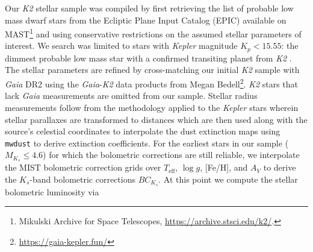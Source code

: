 \documentclass[modern]{aastex63}
\newcommand\gaia{\emph{Gaia}}
\newcommand\kepler{\emph{Kepler}}
\newcommand\ktwo{\emph{K2}}
\newcommand\teff{$T_{\text{eff}}$}
\newcommand\logg{$\log{g}$}
\begin{document}
Our \ktwo{} stellar sample was compiled by first retrieving the list of probable low mass dwarf stars
from the Ecliptic Plane Input Catalog (EPIC) available on MAST\footnote{Mikulski Archive for Space Telescopes,
  \url{https://archive.stsci.edu/k2/}.} and using conservative restrictions on the assumed stellar parameters
of interest. 
We search was limited to stars with \kepler{}
magnitude $K_p<\mathbf{15.55}$: the dimmest probable low mass star with a confirmed transiting planet from \ktwo{}
\citep[NASA Exoplanet Archive;][]{akeson13}. %
The stellar parameters are refined by cross-matching our initial \ktwo{} sample with \gaia{}  
DR2 using the \gaia{-}\ktwo{} data products from Megan Bedell\footnote{\url{https://gaia-kepler.fun/}}. %
\ktwo{} stars that lack \gaia{} measurements are omitted from our sample.
Stellar radius measurements follow from the methodology applied to the \kepler{} stars 
wherein stellar parallaxes are transformed to distances\citep{bailerjones18} which are then used along with
the source's celestial coordinates to interpolate the dust extinction maps using \texttt{mwdust} \citep{bovy16}
to derive extinction coefficients. 
For the earliest stars in our sample ($M_{K_s}\leq 4.6$) for which the bolometric corrections
are still reliable, we interpolate the MIST bolometric correction grids \citep{choi16} over \teff{,} \logg{,} [Fe/H],
and $A_V$ to derive the $K_s$-band bolometric corrections $BC_{K_s}$. At this point we compute the stellar bolometric
luminosity via
\end{document}
